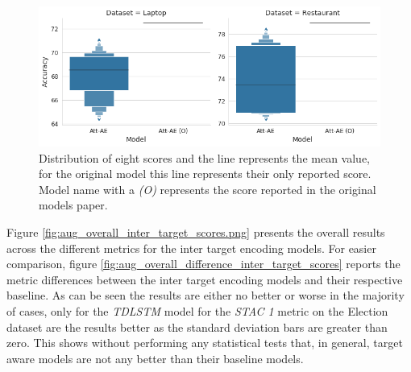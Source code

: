 \begin{figure}[h!]
    \centering
    \includegraphics[scale=0.5]{images/augmentation/methods_performance/Inter_Target/inter_target_reproducability.png}
    \caption{Distribution of eight scores and the line represents the mean value, for the original model this line represents their only reported score. Model name with a \textit{(O)} represents the score reported in the original models paper.}
    \label{fig:aug_inter_target_reproducability}
\end{figure}

Figure \ref{fig:aug_overall_inter_target_scores.png} presents the overall results across the different metrics for the inter target encoding models. For easier comparison, figure \ref{fig:aug_overall_difference_inter_target_scores} reports the metric differences between the inter target encoding models and their respective baseline. As can be seen the results are either no better or worse in the majority of cases, only for the \textit{TDLSTM} model for the \textit{STAC 1} metric on the Election dataset are the results better as the standard deviation bars are greater than zero. This shows without performing any statistical tests that, in general, target aware models are not any better than their baseline models. 


